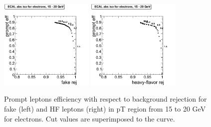 \begin{figure}[htbp]
\begin{center}

 \includegraphics[width = 0.4\textwidth]{pictures/trackCut/bkgdRej_sigEff/elec_fake_ptCut2_ptCut3.png}
\includegraphics[width = 0.4\textwidth]{pictures/trackCut/bkgdRej_sigEff/elec_nonPrompt_ptCut2_ptCut3.png}
\caption{\small{Prompt leptons efficiency with respect to background 
rejection for fake (left) and HF leptons (right) in pT region
from 15 to 20 GeV for electrons. 
Cut values are superimposed to the curve.}\label{fig:ecalrej_el3}}
\end{center}
\end{figure}

